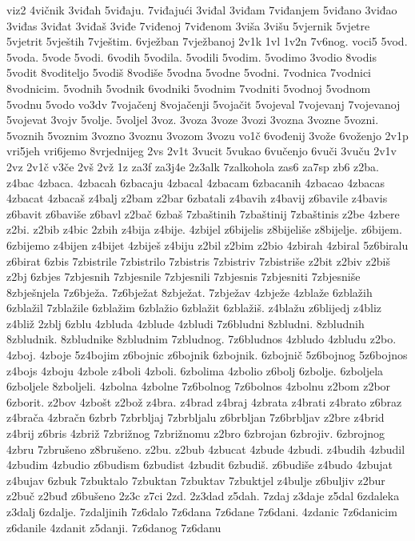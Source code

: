 {viz2
4vičnik
3viđah
5viđaju.
7viđajući
3viđal
3viđam
7viđanjem
5viđano
3viđao
3viđas
3viđat
3viđaš
3viđe
7viđenoj
7viđenom
3viša
3višu
5vjernik
5vjetre
5vjetrit
5vještih
7vještim.
6vježban
7vježbanoj
2v1k
1vl
1v2n
7v6nog.
voci5
5vod.
5voda.
5vode
5vodi.
6vodih
5vodila.
5vodili
5vodim.
5vodimo
3vodio
8vodis
5vodit
8voditeljo
5vodiš
8vodiše
5vodna
5vodne
5vodni.
7vodnica
7vodnici
8vodnicim.
5vodnih
5vodnik
6vodniki
5vodnim
7vodniti
5vodnoj
5vodnom
5vodnu
5vodo
vo3dv
7vojačenj
8vojačenji
5vojačit
5vojeval
7vojevanj
7vojevanoj
5vojevat
3vojv
5volje.
5voljel
3voz.
3voza
3voze
3vozi
3vozna
3vozne
5vozni.
5voznih
5voznim
3vozno
3voznu
3vozom
3vozu
vo1č
6vođenij
3vože
6voženjo
2v1p
vri5jeh
vri6jemo
8vrjednijeg
2vs
2v1t
3vucit
5vukao
6vučenjo
6vuči
3vuču
2v1v
2vz
2v1č
v3če
2vš
2vž
1z
za3f
za3j4e
2z3alk
7zalkohola
zas6
za7sp
zb6
z2ba.
z4bac
4zbaca.
4zbacah
6zbacaju
4zbacal
4zbacam
6zbacanih
4zbacao
4zbacas
4zbacat
4zbacaš
z4balj
z2bam
z2bar
6zbatali
z4bavih
z4bavij
z6bavile
z4bavis
z6bavit
z6baviše
z6bavl
z2bač
6zbaš
7zbaštinih
7zbaštinij
7zbaštinis
z2be
4zbere
z2bi.
z2bib
z4bic
2zbih
z4bija
z4bije.
4zbijel
z6bijelis
z8bijeliše
z8bijelje.
z6bijem.
6zbijemo
z4bijen
z4bijet
4zbiješ
z4biju
z2bil
z2bim
z2bio
4zbirah
4zbiral
5z6biralu
z6birat
6zbis
7zbistrile
7zbistrilo
7zbistris
7zbistriv
7zbistriše
z2bit
z2biv
z2biš
z2bj
6zbjes
7zbjesnih
7zbjesnile
7zbjesnili
7zbjesnis
7zbjesniti
7zbjesniše
8zbješnjela
7z6bježa.
7z6bježat
8zbježat.
7zbježav
4zbježe
4zblaže
6zblažih
6zblažil
7zblažile
6zblažim
6zblažio
6zblažit
6zblažiš.
z4blažu
z6blijedj
z4bliz
z4bliž
2zblj
6zblu
4zbluda
4zblude
4zbludi
7z6bludni
8zbludni.
8zbludnih
8zbludnik.
8zbludnike
8zbludnim
7zbludnog.
7z6bludnos
4zbludo
4zbludu
z2bo.
4zboj.
4zboje
5z4bojim
z6bojnic
z6bojnik
6zbojnik.
6zbojnič
5z6bojnog
5z6bojnos
z4bojs
4zboju
4zbole
z4boli
4zboli.
6zbolima
4zbolio
z6bolj
6zbolje.
6zboljela
6zboljele
8zboljeli.
4zbolna
4zbolne
7z6bolnog
7z6bolnos
4zbolnu
z2bom
z2bor
6zborit.
z2bov
4zbošt
z2bož
z4bra.
z4brad
z4braj
4zbrata
z4brati
z4brato
z6braz
z4brača
4zbračn
6zbrb
7zbrbljaj
7zbrbljalu
z6brbljan
7z6brbljav
z2bre
z4brid
z4brij
z6bris
4zbriž
7zbrižnog
7zbrižnomu
z2bro
6zbrojan
6zbrojiv.
6zbrojnog
4zbru
7zbrušeno
z8brušeno.
z2bu.
z2bub
4zbucat
4zbude
4zbudi.
z4budih
4zbudil
4zbudim
4zbudio
z6budism
6zbudist
4zbudit
6zbudiš.
z6budiše
z4budo
4zbujat
z4bujav
6zbuk
7zbuktalo
7zbuktan
7zbuktav
7zbuktjel
z4bulje
z6buljiv
z2bur
z2buč
z2buđ
z6bušeno
2z3c
z7ci
2zd.
2z3dad
z5dah.
7zdaj
z3daje
z5dal
6zdaleka
z3dalj
6zdalje.
7zdaljinih
7z6dalo
7z6dana
7z6dane
7z6dani.
4zdanic
7z6danicim
z6danile
4zdanit
z5danji.
7z6danog
7z6danu
}
